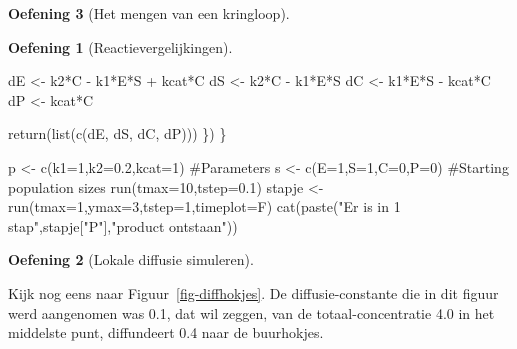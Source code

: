 \documentclass[
  a4paper,
]{scrbook}
\newenvironment{Shaded}{\begin{snugshade}}{\end{snugshade}}
\newcommand{\AttributeTok}[1]{\textcolor[rgb]{0.40,0.45,0.13}{#1}}
\newcommand{\CommentTok}[1]{\textcolor[rgb]{0.37,0.37,0.37}{#1}}
\newcommand{\DecValTok}[1]{\textcolor[rgb]{0.68,0.00,0.00}{#1}}
\newcommand{\FloatTok}[1]{\textcolor[rgb]{0.68,0.00,0.00}{#1}}
\newcommand{\FunctionTok}[1]{\textcolor[rgb]{0.28,0.35,0.67}{#1}}
\newcommand{\NormalTok}[1]{\textcolor[rgb]{0.00,0.23,0.31}{#1}}
\newcommand{\OtherTok}[1]{\textcolor[rgb]{0.00,0.23,0.31}{#1}}
\newcommand{\SpecialCharTok}[1]{\textcolor[rgb]{0.37,0.37,0.37}{#1}}
\newcommand{\StringTok}[1]{\textcolor[rgb]{0.13,0.47,0.30}{#1}}
\theoremstyle{definition}
\newtheorem{exercise}{Oefening}[chapter]
\theoremstyle{remark}
\begin{document}
\begin{exercise}[Het mengen van een
kringloop]
\begin{exercise}[Reactievergelijkingen]
\begin{Shaded}
\begin{Highlighting}[]
\NormalTok{    dE }\OtherTok{\textless{}{-}}\NormalTok{ k2}\SpecialCharTok{*}\NormalTok{C }\SpecialCharTok{{-}}\NormalTok{ k1}\SpecialCharTok{*}\NormalTok{E}\SpecialCharTok{*}\NormalTok{S }\SpecialCharTok{+}\NormalTok{ kcat}\SpecialCharTok{*}\NormalTok{C}
\NormalTok{    dS }\OtherTok{\textless{}{-}}\NormalTok{ k2}\SpecialCharTok{*}\NormalTok{C }\SpecialCharTok{{-}}\NormalTok{ k1}\SpecialCharTok{*}\NormalTok{E}\SpecialCharTok{*}\NormalTok{S}
\NormalTok{    dC }\OtherTok{\textless{}{-}}\NormalTok{ k1}\SpecialCharTok{*}\NormalTok{E}\SpecialCharTok{*}\NormalTok{S }\SpecialCharTok{{-}}\NormalTok{ kcat}\SpecialCharTok{*}\NormalTok{C}
\NormalTok{    dP }\OtherTok{\textless{}{-}}\NormalTok{ kcat}\SpecialCharTok{*}\NormalTok{C}
    
    \FunctionTok{return}\NormalTok{(}\FunctionTok{list}\NormalTok{(}\FunctionTok{c}\NormalTok{(dE, dS, dC, dP)))  }
\NormalTok{  \}) }
\NormalTok{\}}

\NormalTok{p }\OtherTok{\textless{}{-}} \FunctionTok{c}\NormalTok{(}\AttributeTok{k1=}\DecValTok{1}\NormalTok{,}\AttributeTok{k2=}\FloatTok{0.2}\NormalTok{,}\AttributeTok{kcat=}\DecValTok{1}\NormalTok{) }\CommentTok{\#Parameters}
\NormalTok{s }\OtherTok{\textless{}{-}} \FunctionTok{c}\NormalTok{(}\AttributeTok{E=}\DecValTok{1}\NormalTok{,}\AttributeTok{S=}\DecValTok{1}\NormalTok{,}\AttributeTok{C=}\DecValTok{0}\NormalTok{,}\AttributeTok{P=}\DecValTok{0}\NormalTok{) }\CommentTok{\#Starting population sizes}
\FunctionTok{run}\NormalTok{(}\AttributeTok{tmax=}\DecValTok{10}\NormalTok{,}\AttributeTok{tstep=}\FloatTok{0.1}\NormalTok{) }
\NormalTok{stapje }\OtherTok{\textless{}{-}} \FunctionTok{run}\NormalTok{(}\AttributeTok{tmax=}\DecValTok{1}\NormalTok{,}\AttributeTok{ymax=}\DecValTok{3}\NormalTok{,}\AttributeTok{tstep=}\DecValTok{1}\NormalTok{,}\AttributeTok{timeplot=}\NormalTok{F) }
\FunctionTok{cat}\NormalTok{(}\FunctionTok{paste}\NormalTok{(}\StringTok{"Er is in 1 stap"}\NormalTok{,stapje[}\StringTok{"P"}\NormalTok{],}\StringTok{"product ontstaan"}\NormalTok{))}
\end{Highlighting}
\end{Shaded}

\end{exercise}

\begin{exercise}[Lokale diffusie
simuleren]\protect\hypertarget{exr-diffusievraag}{}\label{exr-diffusievraag}

Kijk nog eens naar Figuur~\ref{fig-diffhokjes}. De diffusie-constante
die in dit figuur werd aangenomen was 0.1, dat wil zeggen, van de
totaal-concentratie 4.0 in het middelste punt, diffundeert 0.4 naar de
buurhokjes.


\end{exercise}
\end{exercise}
\end{document}
